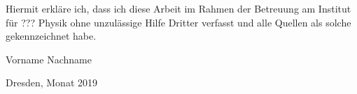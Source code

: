 \documentclass[
    paper=A4,pagesize=automedia,fontsize=12pt,
    BCOR=15mm,DIV=22,
    twoside,headinclude,footinclude=false,
    fleqn,             %
    bibliography=totocnumbered,          %
    listof=totoc,                %
    listof=flat,                 %
    cleardoublepage=empty      %
    numbers=endperiod
]{scrartcl}
\begin{document}
\clearpage
\thispagestyle{empty}
\vspace*{1.5em}

Hiermit erkläre ich, dass ich diese Arbeit im Rahmen der Betreuung am Institut
für ??? Physik ohne unzulässige Hilfe Dritter verfasst und alle Quellen als solche gekennzeichnet habe.

\vspace*{45em}

Vorname Nachname \par
Dresden, Monat 2019



\end{document}

